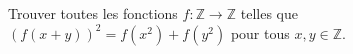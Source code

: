 \documentclass[varwidth]{standalone}
\begin{document}
    Trouver toutes les fonctions $f : \mathbb{Z} \to \mathbb{Z}$ telles que $(f(x + y))^2 = f\left( x^2 \right) + f\left( y^2 \right)$ pour tous $x, y \in \mathbb{Z}$.
\end{document}
